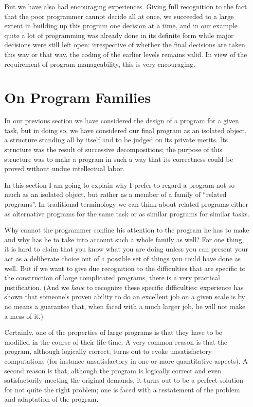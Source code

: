 \documentclass[twoside,11pt]{book}
\begin{document}
But we have also had encouraging experiences. Giving full recognition to the fact that the poor programmer cannot decide all at once, we succeeded to a large extent in building up this program one decision at a time, and in our example quite a lot of programming was already done in its definite form while major decisions were still left open: irrespective of whether the final decisions are taken this way or that way, the coding of the earlier levels remains valid. In view of the requirement of program manageability, this is very encouraging.

\section[On program families]{On Program Families}

In our previous section we have considered the design of a program for a given task, but in doing so, we have considered our final program as an isolated object, a structure standing all by itself and to be judged on its private merits. Its structure was the result of successive decompositions; the purpose of this structure was to make a program in such a way that its correctness could be proved without undue intellectual labor.

In this section I am going to explain why I prefer to regard a program not so much as an isolated object, but rather as a member of a family of ``related programs''. In traditional terminology we can think about related programs either as alternative programs for the same task or as similar programs for similar tasks.

Why cannot the programmer confine his attention to the program he has to make and why has he to take into account such a whole family as well? For one thing, it is hard to claim that you know what you are doing unless you can present your act as a deliberate choice out of a possible set of things you could have done as well. But if we want to give due recognition to the difficulties that are specific to the construction of large complicated programs, there is a very practical justification. (And we \textit{have} to recognize these specific difficulties: experience has shown that someone's proven ability to do an excellent job on a given scale is by no means a guarantee that, when faced with a much larger job, he will not make a mess of it.)

Certainly, one of the properties of large programs is that they have to be modified in the course of their life-time. A very common reason is that the program, although logically correct, turns out to evoke unsatisfactory computations (for instance unsatisfactory in one or more quantitative aspects). A second reason is that, although the program is logically correct and even satisfactorily meeting the original demands, it turns out to be a perfect solution for not quite the right problem; one is faced with a restatement of the problem and adaptation of the program.
\end{document}
